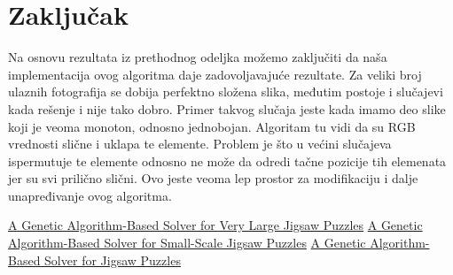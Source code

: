 \documentclass{article}
\begin{document}
\section{Zaključak}
Na osnovu rezultata iz prethodnog odeljka možemo zaključiti da naša implementacija ovog algoritma daje zadovoljavajuće rezultate. Za veliki broj ulaznih fotografija se dobija perfektno složena slika, međutim postoje i slučajevi kada rešenje i nije tako dobro. Primer takvog slučaja jeste kada imamo deo slike koji je veoma monoton, odnosno jednobojan. Algoritam tu vidi da su RGB vrednosti slične i uklapa te elemente. Problem je što u većini slučajeva ispermutuje te elemente odnosno ne može da odredi tačne pozicije tih elemenata jer su svi prilično slični. Ovo jeste veoma lep prostor za modifikaciju i dalje unapređivanje ovog algoritma. 
\newpage

\begin{thebibliography}{8}

\href{https://openaccess.thecvf.com/content_cvpr_2013/papers/Sholomon_A_Genetic_Algorithm-Based_2013_CVPR_paper.pdf}{A Genetic Algorithm-Based Solver for Very Large Jigsaw Puzzles}
\href{https://link.springer.com/chapter/10.1007/978-3-030-53956-6_32}{A Genetic Algorithm-Based Solver for Small-Scale Jigsaw Puzzles}
\href{https://web.stanford.edu/class/cs231a/prev_projects_2015/JordanDavidson.pdf}{A Genetic Algorithm-Based Solver for Jigsaw Puzzles}
\end{thebibliography}
\end{document}
